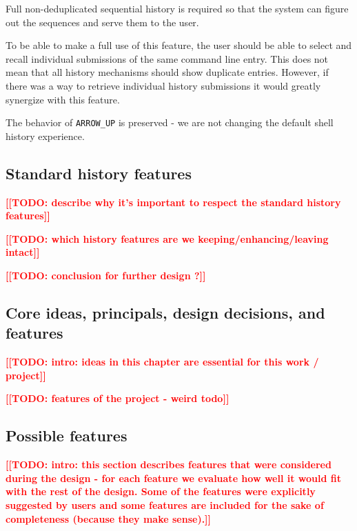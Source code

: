 \documentclass[thesis=M,english]{FITthesis}[2012/10/20]
\newcommand{\blind}[1][1]{}
\newcommand{\todotext}[1]{\textcolor{red}{\textbf{[[#1]]}}}
\begin{document}
Full non-deduplicated sequential history is required so that the system can figure out the sequences and serve them to the user. %

To be able to make a full use of this feature, the user should be able to select and recall individual submissions of the same command line entry. This does not mean that all history mechanisms should show duplicate entries. However, if there was a way to retrieve individual history submissions it would greatly synergize with this feature.

The behavior of \verb|ARROW_UP| is preserved - we are not changing the default shell history experience.

\subsection{Standard history features}

\todotext{TODO: describe why it's important to respect the standard history features}

\todotext{TODO: which history features are we keeping/enhancing/leaving intact}

\blind[3]

\todotext{TODO: conclusion for further design ?}



\subsection{Core ideas, principals, design decisions, and features}

\todotext{TODO: intro: ideas in this chapter are essential for this work / project}

\todotext{TODO: features of the project - weird todo}

\blind[3]

\subsection{Possible features}

\todotext{TODO: intro: this section describes features that were considered during the design - for each feature we evaluate how well it would fit with the rest of the design. Some of the features were explicitly suggested by users and some features are included for the sake of completeness (because they make sense).}

\end{document}
